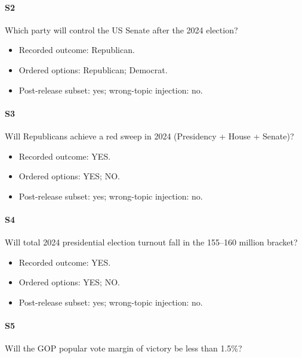 \paragraph*{S2} Which party will control the US Senate after the 2024 election?

\begin{itemize}

\item Recorded outcome: Republican.

\item Ordered options: Republican; Democrat.

\item Post-release subset: yes; wrong-topic injection: no.

\end{itemize}

\paragraph*{S3} Will Republicans achieve a red sweep in 2024 (Presidency + House + Senate)?

\begin{itemize}

\item Recorded outcome: YES.

\item Ordered options: YES; NO.

\item Post-release subset: yes; wrong-topic injection: no.

\end{itemize}

\paragraph*{S4} Will total 2024 presidential election turnout fall in the 155--160 million bracket?

\begin{itemize}

\item Recorded outcome: YES.

\item Ordered options: YES; NO.

\item Post-release subset: yes; wrong-topic injection: no.

\end{itemize}

\paragraph*{S5} Will the GOP popular vote margin of victory be less than 1.5\%?

